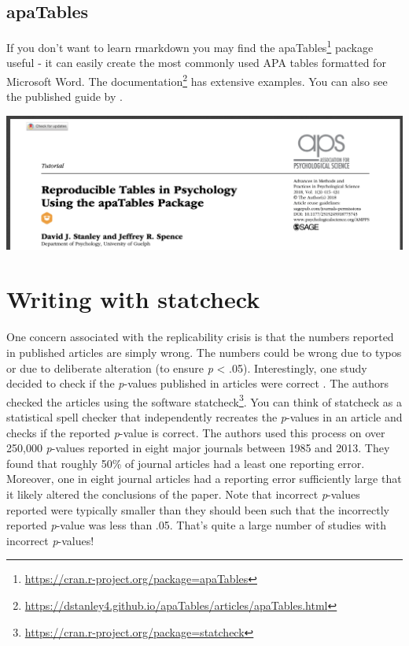 \documentclass[
]{krantz}
\renewcommand{\href}[2]{#2\footnote{\url{#1}}}
\begin{document}
\hypertarget{apatables}{%
\subsection{apaTables}\label{apatables}}

If you don't want to learn rmarkdown you may find the \href{https://cran.r-project.org/package=apaTables}{apaTables} package useful - it can easily create the most commonly used APA tables formatted for Microsoft Word. The \href{https://dstanley4.github.io/apaTables/articles/apaTables.html}{documentation} has extensive examples. You can also see the published guide by \citet{stanley2018reproducible}.

\includegraphics[width=0.6\linewidth]{ch_tools/images/apaTables_paper}

\hypertarget{writing-with-statcheck}{%
\section{Writing with statcheck}\label{writing-with-statcheck}}

One concern associated with the replicability crisis is that the numbers reported in published articles are simply wrong. The numbers could be wrong due to typos or due to deliberate alteration (to ensure \emph{p} \textless{} .05). Interestingly, one study decided to check if the \emph{p}-values published in articles were correct \citep{nuijten2016prevalence}. The authors checked the articles using the software \href{https://cran.r-project.org/package=statcheck}{statcheck}. You can think of statcheck as a statistical spell checker that independently recreates the \emph{p}-values in an article and checks if the reported \emph{p}-value is correct. The authors used this process on over 250,000 \emph{p}-values reported in eight major journals between 1985 and 2013. They found that roughly 50\% of journal articles had a least one reporting error. Moreover, one in eight journal articles had a reporting error sufficiently large that it likely altered the conclusions of the paper. Note that incorrect \emph{p}-values reported were typically smaller than they should been such that the incorrectly reported \emph{p}-value was less than .05. That's quite a large number of studies with incorrect \emph{p}-values!
\end{document}
